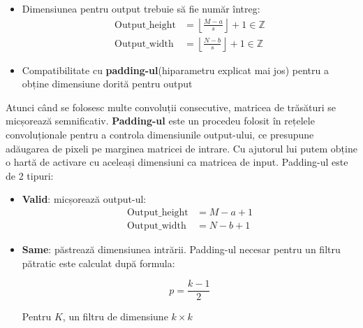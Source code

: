 \begin{itemize}
    \item Dimensiunea pentru output trebuie să fie număr întreg:
        \begin{equation}
        \begin{aligned}
            \text{Output\_height} &= \left\lfloor \frac{M - a}{s} \right\rfloor + 1 \in \mathbb{Z} \\
            \text{Output\_width} &= \left\lfloor \frac{N - b}{s} \right\rfloor + 1 \in \mathbb{Z}
        \end{aligned}
        \label{}
        \end{equation}
    \item Compatibilitate cu \textbf{padding-ul}(hiparametru explicat mai jos) pentru a obține dimensiune dorită pentru output
\end{itemize}

Atunci când se folosesc multe convoluții consecutive, matricea de trăsături se micșorează semnificativ. \textbf{Padding-ul} este un procedeu folosit în rețelele convoluționale pentru a controla dimensiunile output-ului, ce presupune adăugarea de pixeli pe marginea matricei de intrare. Cu ajutorul lui putem obține o hartă de activare cu aceleași dimensiuni ca matricea de input. Padding-ul este de 2 tipuri:

\begin{itemize}
    \item \textbf{Valid}: micșorează output-ul:
        \begin{equation}
            \begin{aligned}
            \text{Output\_height} &= {M - a} + 1  \\
            \text{Output\_width} &= {N - b} + 1 
        \end{aligned}
        \end{equation}
    \item \textbf{Same}: păstrează dimensiunea intrării. Padding-ul necesar pentru un filtru pătratic este calculat după formula:

    \begin{equation}
        p = \frac{k-1}{2}
    \end{equation}

    Pentru $K$, un filtru de dimensiune $k\times k$
    
\end{itemize}

